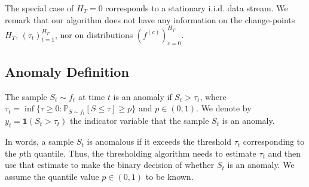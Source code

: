 The special case of $H_T = 0$ corresponds to a stationary i.i.d. data stream.
We remark that our algorithm does not have any information on the change-points  $H_T$, $(\tau_t)_{t=1}^{H_T}$, nor on distributions $(f^{(c)})_{c=0}^{H_T}$. %

\subsection{Anomaly Definition} 
\label{subsec:anomaly_defn}
%

\begin{definition}[Anomalies] 
The sample $S_t \sim f_t$ at time $t$ is an anomaly if $S_t > \tau_t$, where $\tau_{t} = \inf \{ \tau\geq 0: \mathbb{P}_{S \sim f_t}[S \leq \tau] \geq p \}$ and $p \in (0,1)$. We denote by $y_t = \mathbf{1}(S_t > \tau_t)$ the indicator variable that the sample $S_t$ is an anomaly.
\label{def:anomaly}
\end{definition}
In words, a sample $S_t$ is anomalous if it exceeds the threshold $\tau_t$ corresponding to the $p$th quantile. Thus, the thresholding algorithm needs to estimate $\tau_t$ and then use that estimate to make the binary decision of whether $S_t$ is an anomaly.
We assume the quantile value $p \in (0,1)$ to be known. 


